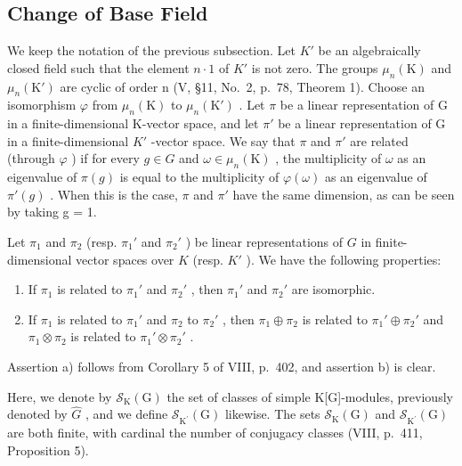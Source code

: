 \subsection{Change of Base Field}

We keep the notation of the previous subsection. Let \(K'\) be an algebraically closed field such that the element \(n \cdot 1\) of \(K'\) is not zero. The groups \(\mu_{n}(\mathrm{K})\) and \(\mu_{n}(\mathrm{K}')\) are cyclic of order n (V, §11, No.~2, p.~78, Theorem 1). Choose an isomorphism \(\varphi\) from \(\mu_{n}(\mathrm{K})\) to \(\mu_{n}(\mathrm{K}')\) . Let \(\pi\) be a linear representation of G in a finite-dimensional K-vector space, and let \(\pi'\) be a linear representation of G in a finite-dimensional \(K'\) -vector space. We say that \(\pi\) and \(\pi'\) are related (through \(\varphi\) ) if for every \(g \in G\) and \(\omega \in \mu_{n}(\mathrm{K})\) , the multiplicity of \(\omega\) as an eigenvalue of \(\pi(g)\) is equal to the multiplicity of \(\varphi(\omega)\) as an eigenvalue of \(\pi'(g)\) . When this is the case, \(\pi\) and \(\pi'\) have the same dimension, as can be seen by taking g = 1.

Let \(\pi_1\) and \(\pi_2\) (resp. \(\pi_1'\) and \(\pi_2'\) ) be linear representations of \(G\) in finite-dimensional vector spaces over \(K\) (resp. \(K'\) ). We have the following properties:

\begin{enumerate}
\def\labelenumi{\alph{enumi})}
\item
  If \(\pi_1\) is related to \(\pi_1'\) and \(\pi_2'\) , then \(\pi_1'\) and \(\pi_2'\) are isomorphic.
\item
  If \(\pi_1\) is related to \(\pi_1'\) and \(\pi_2\) to \(\pi_2'\) , then \(\pi_1 \oplus \pi_2\) is related to \(\pi_1' \oplus \pi_2'\) and \(\pi_1 \otimes \pi_2\) is related to \(\pi_1' \otimes \pi_2'\) .
\end{enumerate}

Assertion a) follows from Corollary 5 of VIII, p.~402, and assertion b) is clear.

Here, we denote by \(\mathcal{S}_{\mathrm{K}}(\mathrm{G})\) the set of classes of simple K{[}G{]}-modules, previously denoted by \(\widehat{G}\) , and we define \(\mathcal{S}_{\mathrm{K}^{\prime}}(\mathrm{G})\) likewise. The sets \(\mathcal{S}_{\mathrm{K}}(\mathrm{G})\) and \(\mathcal{S}_{\mathrm{K}^{\prime}}(\mathrm{G})\) are both finite, with cardinal the number of conjugacy classes (VIII, p.~411, Proposition 5).

